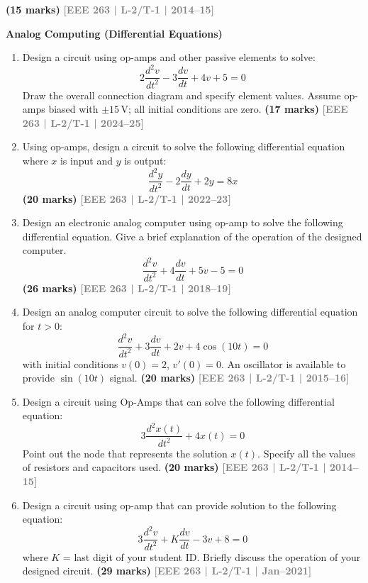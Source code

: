 \documentclass[12pt,a3paper]{article}
\newcommand{\yr}[1]{\hfill\textcolor{gray}{\small\textbf{[#1]}}}
\newcommand{\mk}[1]{\textcolor{orange!70!black}{\small\textbf{(#1 marks)}}}
\newcommand{\subtopic}[2]{%
  \vspace{10pt}
  \noindent\begin{tcolorbox}[colback=#1!8,colframe=#1,boxrule=0.6pt,arc=4pt,
    left=6pt,right=6pt,top=4pt,bottom=4pt]
    \small\bfseries\textcolor{#1}{#2}
  \end{tcolorbox}
  \vspace{2pt}
}
\begin{document}
\begin{enumerate}
\begin{center}
\end{center}
\mk{15} \yr{EEE 263 | L-2/T-1 | 2014--15}

\end{enumerate}

\subtopic{cE}{Analog Computing (Differential Equations)}
\label{sub:s7-analog}

\begin{enumerate}\item Design a circuit using op-amps and other passive elements to solve:
\[
2\frac{d^2v}{dt^2} - 3\frac{dv}{dt} + 4v + 5 = 0
\]
Draw the overall connection diagram and specify element values. Assume op-amps biased with $\pm15\,\text{V}$; all initial conditions are zero.
\mk{17} \yr{EEE 263 | L-2/T-1 | 2024--25}

\item Using op-amps, design a circuit to solve the following differential equation where $x$ is input and $y$ is output:
\[
\frac{d^2y}{dt^2} - 2\frac{dy}{dt} + 2y = 8x
\]
\mk{20} \yr{EEE 263 | L-2/T-1 | 2022--23}

\item Design an electronic analog computer using op-amp to solve the following differential equation. Give a brief explanation of the operation of the designed computer.
\[
\frac{d^2v}{dt^2} + 4\frac{dv}{dt} + 5v - 5 = 0
\]
\mk{26} \yr{EEE 263 | L-2/T-1 | 2018--19}

\item Design an analog computer circuit to solve the following differential equation for $t>0$:
\[
\frac{d^2v}{dt^2} + 3\frac{dv}{dt} + 2v + 4\cos(10t) = 0
\]
with initial conditions $v(0)=2$, $v'(0)=0$. An oscillator is available to provide $\sin(10t)$ signal.
\mk{20} \yr{EEE 263 | L-2/T-1 | 2015--16}

\item Design a circuit using Op-Amps that can solve the following differential equation:
\[
3\frac{d^2x(t)}{dt^2} + 4x(t) = 0
\]
Point out the node that represents the solution $x(t)$. Specify all the values of resistors and capacitors used.
\mk{20} \yr{EEE 263 | L-2/T-1 | 2014--15}

\item Design a circuit using op-amp that can provide solution to the following equation:
\[
3\frac{d^2v}{dt^2} + K\frac{dv}{dt} - 3v + 8 = 0
\]
where $K$ = last digit of your student ID. Briefly discuss the operation of your designed circuit.
\mk{29} \yr{EEE 263 | L-2/T-1 | Jan--2021}

\end{enumerate}
\end{document}
